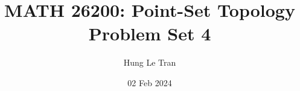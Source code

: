 \documentclass[a4paper, 12pt]{article}
\title{MATH 26200: Point-Set Topology \\ \large Problem Set 4}
\date{02 Feb 2024}
\author{Hung Le Tran}
\begin{document}
\maketitle
\setcounter{section}{4}
\begin{problem} [Problem 1]
\end{problem}
\begin{solution}
\end{solution}
\end{document}
